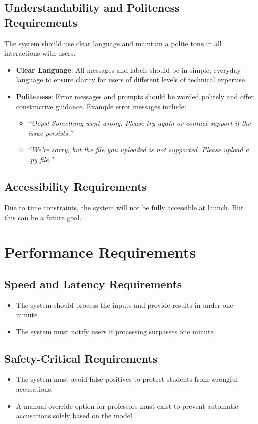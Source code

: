\documentclass[12pt]{article}
\begin{document}
\subsection{Understandability and Politeness Requirements}
The system should use clear language and maintain a polite tone in all 
interactions with users.
\begin{itemize}
    \item \textbf{Clear Language}: All messages and labels should be in simple, 
    everyday language to ensure clarity for users of different levels of 
    technical expertise.
    
    \item \textbf{Politeness}: Error messages and prompts should be worded 
    politely and offer constructive guidance. Example error messages include:
    \begin{itemize}
        \item \textit{“Oops! Something went wrong. Please try again or contact 
        support if the issue persists.”}
        \item \textit{“We're sorry, but the file you uploaded is not supported. 
        Please upload a .py file.”}
    \end{itemize}
\end{itemize}

\subsection{Accessibility Requirements}
Due to time constraints, the system will not be fully accessible at launch. But this can be a future goal.

\section{Performance Requirements}
\subsection{Speed and Latency Requirements}
\begin{itemize}
    \item The system should process the inputs and provide results in under one minute 
    \item The system must notify users if processing surpasses one minute
\end{itemize}
\subsection{Safety-Critical Requirements}
\begin{itemize}
    \item The system must avoid false positives to protect students from wrongful accusations. 
    \item A manual override option for professors must exist to prevent automatic accusations solely based on the model.
\end{itemize}
\end{document}
